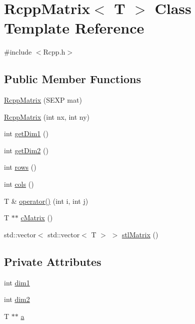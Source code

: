 \hypertarget{classRcppMatrix}{
\section{RcppMatrix$<$ T $>$ Class Template Reference}
\label{classRcppMatrix}
}


{\ttfamily \#include $<$Rcpp.h$>$}\subsection*{Public Member Functions}
\begin{DoxyCompactItemize}
\item 
\hyperlink{classRcppMatrix_a6cdd09180c21b504d1455ae2bc8939a7}{RcppMatrix} (SEXP mat)
\item 
\hyperlink{classRcppMatrix_a9ac16e2fcccd2a21a33097139e4ec253}{RcppMatrix} (int nx, int ny)
\item 
int \hyperlink{classRcppMatrix_aedbe27d643d704a0f5a995821307fdaf}{getDim1} ()
\item 
int \hyperlink{classRcppMatrix_a356e04f844e3ebfac29b50e2e749734f}{getDim2} ()
\item 
int \hyperlink{classRcppMatrix_a17749a8e567433b055be1221c399f0cd}{rows} ()
\item 
int \hyperlink{classRcppMatrix_a1b92a0bda663e14ea2f225e755029299}{cols} ()
\item 
T \& \hyperlink{classRcppMatrix_a7733c87524d7e216f70fc10ccc971a29}{operator()} (int i, int j)
\item 
T $\ast$$\ast$ \hyperlink{classRcppMatrix_ae94a95b2125bd594965e26a93c994da4}{cMatrix} ()
\item 
std::vector$<$ std::vector$<$ T $>$ $>$ \hyperlink{classRcppMatrix_ae74547edb5d989adb87b2e483153de89}{stlMatrix} ()
\end{DoxyCompactItemize}
\subsection*{Private Attributes}
\begin{DoxyCompactItemize}
\item 
int \hyperlink{classRcppMatrix_a3b2f3ef7c2b482e4f7e7f4f96b787128}{dim1}
\item 
int \hyperlink{classRcppMatrix_ad01bc64d89dcc475f7c90f1580bf5d52}{dim2}
\item 
T $\ast$$\ast$ \hyperlink{classRcppMatrix_a3f4dad8e2aed525c9b20e98d262ec31e}{a}
\end{DoxyCompactItemize}


